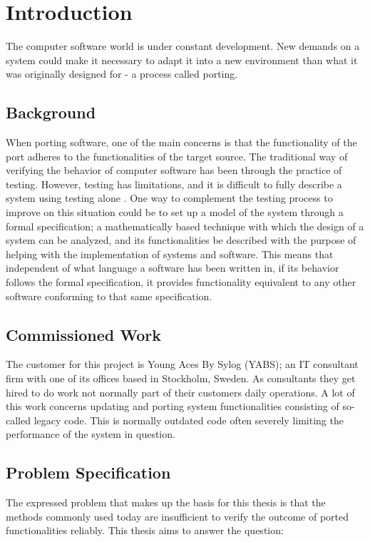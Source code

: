 \section{Introduction}\label{introduction}

The computer software world is under constant development. New demands on a system could make it necessary to adapt it into a new environment than what it was originally designed for - a process called porting. 

\subsection{Background}

When porting software, one of the main concerns is that the functionality of the port adheres to the functionalities of the target source. The traditional way of verifying the behavior of computer software has been through the practice of testing. However, testing has limitations, and it is difficult to fully describe a system using testing alone \cite{testingisnecessary}. One way to complement the testing process to improve on this situation could be to set up a model of the system through a formal specification; a mathematically based technique with which the design of a system can be analyzed, and its functionalities be described with the purpose of helping with the implementation of systems and software. This means that independent of what language a software has been written in, if its behavior follows the formal specification, it provides functionality equivalent to any other software conforming to that same specification.

\subsection{Commissioned Work}
The customer for this project is Young Aces By Sylog (YABS); an IT consultant firm with one of its offices based in Stockholm, Sweden. As consultants they get hired to do work not normally part of their customers daily operations. A lot of this work concerns updating and porting system functionalities consisting of so-called legacy code. This is normally outdated code often severely limiting the performance of the system in question.

\subsection{Problem Specification}
The expressed problem that makes up the basis for this thesis is that the methods commonly used today are insufficient to verify the outcome of ported functionalities reliably. This thesis aims to answer the question: 

